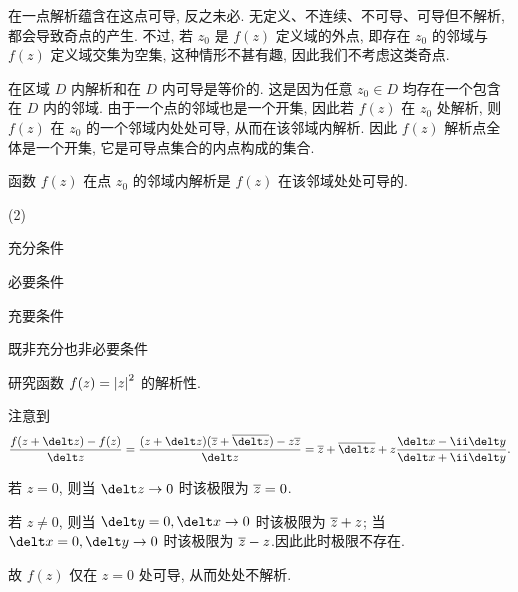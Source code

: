 
  \alert{在一点解析蕴含在这点可导, 反之未必.} 
无定义、不连续、不可导、可导但不解析, 都会导致奇点的产生.
不过, 若 $z_0$ 是 $f(z)$ 定义域的外点, 即存在 $z_0$ 的邻域与 $f(z)$ 定义域交集为空集, 这种情形不甚有趣, 因此我们不考虑这类奇点.

  \alert{在区域 $D$ 内解析和在 $D$ 内可导是等价的.} 
这是因为任意 $z_0\in D$ 均存在一个包含在 $D$ 内的邻域.
由于一个点的邻域也是一个开集, 因此若 $f(z)$ 在 $z_0$ 处解析, 则 $f(z)$ 在 $z_0$ 的一个邻域内处处可导, 从而在该邻域内解析. 因此 \alert{$f(z)$ 解析点全体是一个开集}, 它是可导点集合的内点构成的集合.

\begin{exercise}
  函数 $f(z)$ 在点 $z_0$ 的邻域内解析是 $f(z)$ 在该邻域处处可导的\fillbrace{}.
  \begin{examplechoice}(2)
    \item 充分条件
    \item 必要条件
    \item 充要条件
    \item 既非充分也非必要条件
  \end{examplechoice}
\end{exercise}

\begin{example}
  研究函数 $f(z)=\left|z\right|^2$ 的解析性.
\end{example}

\begin{solution}
  注意到
  \[
     \frac{f(z+\delt z)-f(z)}{\delt z}
    =\frac{(z+\delt z)(\ov z+\ov{\delt z})-z\ov z}{\delt z}
    =\ov z+\ov{\delt z}
      +z\frac{\delt x-\ii\delt y}{\delt x+\ii\delt y}.
  \]
  \vspace{-\baselineskip}
  \begin{enumr}
    \item 若 $z=0$, 则当 $\delt z\ra 0$ 时该极限为 $\overline z=0$.
    \item 若 $z\neq0$, 则当 $\delt y=0,\delt x\ra 0$ 时该极限为 $\overline z+z$; 当 $\delt x=0,\delt y\ra 0$ 时该极限为 $\overline z-z$.因此此时极限不存在.
  \end{enumr}
  故 $f(z)$ 仅在 $z=0$ 处可导, 从而处处不解析.
\end{solution}

